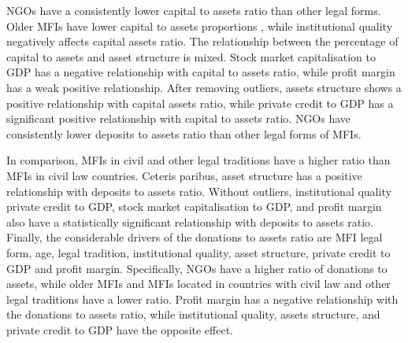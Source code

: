 \documentclass[a4paper, nobind]{templates/ociamthesis}
\begin{document}
NGOs have a consistently lower capital to assets ratio than other legal forms. Older MFIs have lower capital to assets proportions , while institutional quality negatively affects capital assets ratio. The relationship between the percentage of capital to assets and asset structure is mixed. Stock market capitalisation to GDP has a negative relationship with capital to assets ratio, while profit margin has a weak positive relationship. After removing outliers, assets structure shows a positive relationship with capital assets ratio, while private credit to GDP has a significant positive relationship with capital to assets ratio. NGOs have consistently lower deposits to assets ratio than other legal forms of MFIs.

In comparison, MFIs in civil and other legal traditions have a higher ratio than MFIs in civil law countries. Ceteris paribus, asset structure has a positive relationship with deposits to assets ratio. Without outliers, institutional quality private credit to GDP, stock market capitalisation to GDP, and profit margin also have a statistically significant relationship with deposits to assets ratio. Finally, the considerable drivers of the donations to assets ratio are MFI legal form, age, legal tradition, institutional quality, asset structure, private credit to GDP and profit margin. Specifically, NGOs have a higher ratio of donations to assets, while older MFIs and MFIs located in countries with civil law and other legal traditions have a lower ratio. Profit margin has a negative relationship with the donations to assets ratio, while institutional quality, assets structure, and private credit to GDP have the opposite effect.
\end{document}
